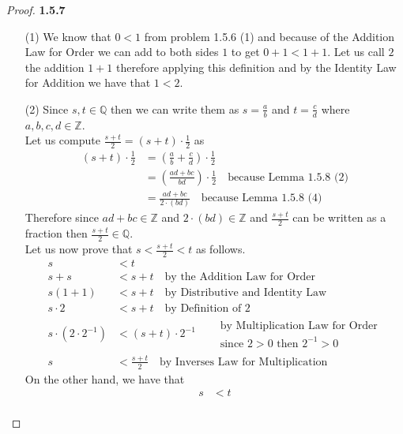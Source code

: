 \documentclass[11pt]{article}
\newcommand{\Z}{\mathbb{Z}}
\newcommand{\Q}{\mathbb{Q}}
\theoremstyle{definition}
\begin{document}
    \begin{proof}{\textbf{1.5.7}}
    \begin{itemize}
        \item [(1)]
        We know that $0<1$ from problem 1.5.6 (1) and because of the Addition Law for
        Order we can add to both sides $1$ to get $0+1<1+1$. Let us call $2$ the addition 
        $1+1$ therefore applying this definition and by the Identity Law for Addition we
        have that $1<2$.
        \item [(2)]
        Since $s,t \in \Q$ then we can write them as $s=\frac{a}{b}$ and $t=\frac{c}{d}$
        where $a,b,c,d \in \Z$.\\
        Let us compute $\frac{s + t}{2} = (s+t)\cdot \frac{1}{2}$ as
        \begin{align*}
            (s+t)\cdot \frac{1}{2} &= (\frac{a}{b} + \frac{c}{d})\cdot \frac{1}{2}\\
                &= (\frac{ad+bc}{bd})\cdot \frac{1}{2} \quad \text{because Lemma 1.5.8 (2)}\\
                &= \frac{ad+bc}{2 \cdot (bd)} \quad \text{because Lemma 1.5.8 (4)}
        \end{align*}
        Therefore since $ad+bc \in \Z$ and $2\cdot (bd) \in \Z$ and $\frac{s+t}{2}$ can
        be written as a fraction then $\frac{s+t}{2} \in \Q$.\\
        Let us now prove that $s< \frac{s+t}{2}<t$ as follows.
        \begin{align*}
            s&<t\\
            s+s&<s+t \quad \text{by the Addition Law for Order}\\
            s(1+1)&<s+t \quad \text{by Distributive and Identity Law}\\
            s\cdot 2 &< s+t \quad \text{by Definition of 2}\\
            s \cdot (2\cdot 2^{-1}) &< (s+t) \cdot 2^{-1}\quad
                \begin{aligned}
                    &\text{by Multiplication Law for Order}\\
                    &\text{since }2>0\text{ then }2^{-1}>0
                \end{aligned}\\
            s &< \frac{s+t}{2} \quad \text{by Inverses Law for Multiplication}
        \end{align*}
        On the other hand, we have that
        \begin{align*}
            s&<t\\

\end{align*}
\end{itemize}
\end{proof}
\end{document}
